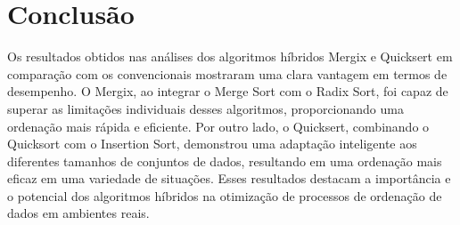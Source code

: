 \documentclass[12pt]{article}
\begin{document}
\section{Conclusão}

Os resultados obtidos nas análises dos algoritmos híbridos Mergix e Quicksert em comparação com os convencionais mostraram uma clara vantagem em termos de desempenho. O Mergix, ao integrar o Merge Sort com o Radix Sort, foi capaz de superar as limitações individuais desses algoritmos, proporcionando uma ordenação mais rápida e eficiente. Por outro lado, o Quicksert, combinando o Quicksort com o Insertion Sort, demonstrou uma adaptação inteligente aos diferentes tamanhos de conjuntos de dados, resultando em uma ordenação mais eficaz em uma variedade de situações. Esses resultados destacam a importância e o potencial dos algoritmos híbridos na otimização de processos de ordenação de dados em ambientes reais.
\end{document}
